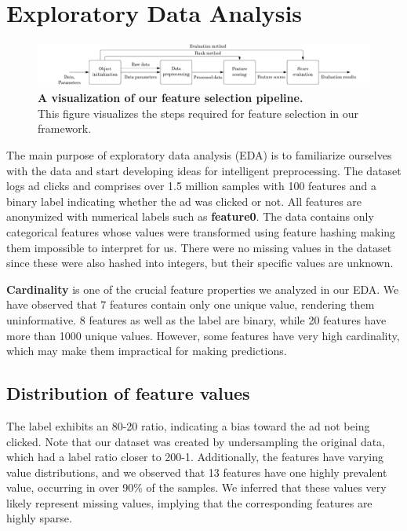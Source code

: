 \documentclass[fleqn,moreauthors,10pt]{ds_report}
\begin{document}

\section*{Exploratory Data Analysis}

\begin{figure}
	\includegraphics[width=\linewidth]{img/block_diagram_cropped.png}
    \captionsetup{justification=centering}
	\caption{\textbf{A visualization of our feature selection pipeline.}\\ This figure visualizes the steps required for feature selection in our framework.}
	\label{fig:block_diagram}
\end{figure}

The main purpose of exploratory data analysis (EDA) is to familiarize ourselves with the data and start developing ideas for intelligent preprocessing. The dataset logs ad clicks and comprises over 1.5 million samples with 100 features and a binary label indicating whether the ad was clicked or not. All features are anonymized with numerical labels such as \textbf{feature0}. The data contains only categorical features whose values were transformed using feature hashing making them impossible to interpret for us. There were no missing values in the dataset since these were also hashed into integers, but their specific values are unknown. 

\textbf{Cardinality} is one of the crucial feature properties we analyzed in our EDA. We have observed that 7 features contain only one unique value, rendering them uninformative. 8 features as well as the label are binary, while 20 features have more than 1000 unique values. However, some features have very high cardinality, which may make them impractical for making predictions.

\subsection*{Distribution of feature values}
The label exhibits an 80-20 ratio, indicating a bias toward the ad not being clicked. Note that our dataset was created by undersampling the original data, which had a label ratio closer to 200-1. Additionally, the features have varying value distributions, and we observed that 13 features have one highly prevalent value, occurring in over 90\% of the samples. We inferred that these values very likely represent missing values, implying that the corresponding features are highly sparse. 
\end{document}
